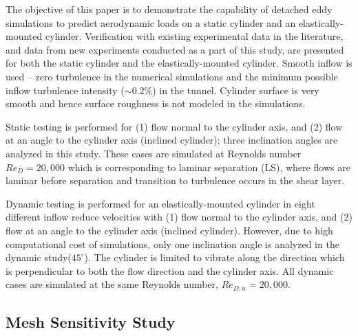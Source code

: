 \documentclass[12pt,authoryear]{elsarticle}
\begin{document}
The objective of this paper is to demonstrate the capability of detached eddy
simulations to predict aerodynamic loads on a static cylinder and an elastically-mounted cylinder.
Verification with existing experimental data in the literature, and data from
new experiments conducted as a part of this study, are presented for both the static
cylinder and the elastically-mounted cylinder. Smooth inflow is used -- zero
turbulence in the numerical simulations and the minimum possible inflow
turbulence intensity ($\sim$0.2\%) in the tunnel. Cylinder surface is very
smooth and hence surface roughness is not modeled in the simulations.

Static testing is performed for (1) flow normal to the cylinder axis, and (2)
flow at an angle to the cylinder axis (inclined cylinder); three inclination
angles are analyzed in this study. These cases are simulated at Reynolds
number $Re_D=20,000$ which is corresponding to laminar separation (LS), where 
flows are laminar before separation and transition to
turbulence occurs in the shear layer.

Dynamic testing is performed for an elastically-mounted cylinder in eight different 
inflow reduce velocities with 
(1) flow normal to the cylinder axis, and (2) flow at an angle to the 
cylinder axis (inclined cylinder). However, due to high computational cost of simulations,
only one inclination angle is analyzed in the dynamic study($45^\circ$). The cylinder
is limited to vibrate along the direction which is perpendicular to both 
the flow direction and the cylinder axis. All
dynamic cases are simulated at the same Reynolds number, $Re_{D,n}=20,000$.

\subsection{Mesh Sensitivity Study}
\label{sec:mesh_sensitivity}
%
\end{document}

